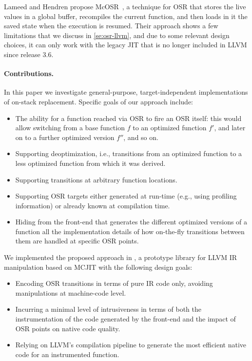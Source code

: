 Lameed and Hendren propose McOSR~\cite{lameed2013modular}, a technique for OSR that stores the live values in a global buffer, recompiles the current function, and then loads in it the saved state when the execution is resumed. Their approach shows a few limitations that we discuss in \mysection\ref{se:osr-llvm}, and due to some relevant design choices, it can only work with the legacy JIT that is no longer included in LLVM since release 3.6.

\paragraph{Contributions.}
In this paper we investigate general-purpose, target-independent implementations of on-stack replacement. Specific goals of our approach include:
\begin{itemize}
\item The ability for a function reached via OSR to fire an OSR itself: this would allow switching from a base function $f$ to an optimized function $f'$, and later on to a further optimized version $f''$, and so on.
\item Supporting deoptimization, i.e., transitions from an optimized function to a less optimized function from which it was derived.
\item Supporting transitions at arbitrary function locations.
\item Supporting OSR targets either generated at run-time (e.g., using profiling information) or already known at compilation time.
\item Hiding from the front-end that generates the different optimized versions of a function all the implementation details of how on-the-fly transitions between them are handled at specific OSR points.
\end{itemize}

\noindent We implemented the proposed approach in \osrkit, a prototype library for LLVM IR manipulation based on MCJIT with the following design goals:
\begin{itemize}
\item Encoding OSR transitions in terms of pure IR code only, avoiding manipulations at machine-code level.
\item Incurring a minimal level of intrusiveness in terms of both the instrumentation of the code generated by the front-end and the impact of OSR points on native code quality.
\item Relying on LLVM's compilation pipeline to generate the most efficient native code for an instrumented function.
\end{itemize}

